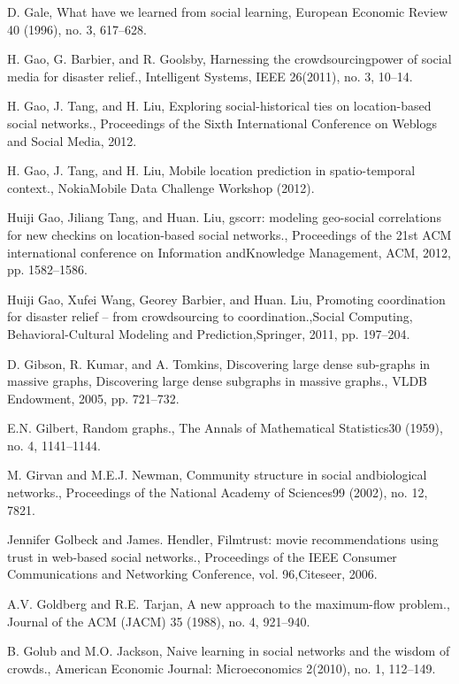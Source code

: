 \begin{thebibliography}{999}
 D. Gale, What have we learned from social learning, European Economic Review 40 (1996), no. 3, 617–628.

 H. Gao, G. Barbier, and R. Goolsby, Harnessing the crowdsourcingpower of social media for disaster relief., Intelligent Systems, IEEE 26(2011), no. 3, 10–14.

 H. Gao, J. Tang, and H. Liu, Exploring social-historical ties on location-based social networks., Proceedings of the Sixth International Conference on Weblogs and Social Media, 2012.

 H. Gao, J. Tang, and H. Liu, Mobile location prediction in spatio-temporal context., NokiaMobile Data Challenge Workshop (2012).

 Huiji Gao, Jiliang Tang, and Huan. Liu, gscorr: modeling geo-social correlations for new checkins on location-based social networks., Proceedings of the 21st ACM international conference on Information andKnowledge Management, ACM, 2012, pp. 1582–1586.

 Huiji Gao, Xufei Wang, Georey Barbier, and Huan. Liu, Promoting coordination for disaster relief – from crowdsourcing to coordination.,Social Computing, Behavioral-Cultural Modeling and Prediction,Springer, 2011, pp. 197–204.

 D. Gibson, R. Kumar, and A. Tomkins, Discovering large dense sub-graphs in massive graphs, Discovering large dense subgraphs in massive graphs., VLDB Endowment, 2005, pp. 721–732.

 E.N. Gilbert, Random graphs., The Annals of Mathematical Statistics30 (1959), no. 4, 1141–1144.

 M. Girvan and M.E.J. Newman, Community structure in social andbiological networks., Proceedings of the National Academy of Sciences99 (2002), no. 12, 7821.

 Jennifer Golbeck and James. Hendler, Filmtrust: movie recommendations using trust in web-based social networks., Proceedings of the IEEE Consumer Communications and Networking Conference, vol. 96,Citeseer, 2006.

 A.V. Goldberg and R.E. Tarjan, A new approach to the maximum-flow problem., Journal of the ACM (JACM) 35 (1988), no. 4, 921–940.

 B. Golub and M.O. Jackson, Naive learning in social networks and the wisdom of crowds., American Economic Journal: Microeconomics 2(2010), no. 1, 112–149.


\end{thebibliography}
